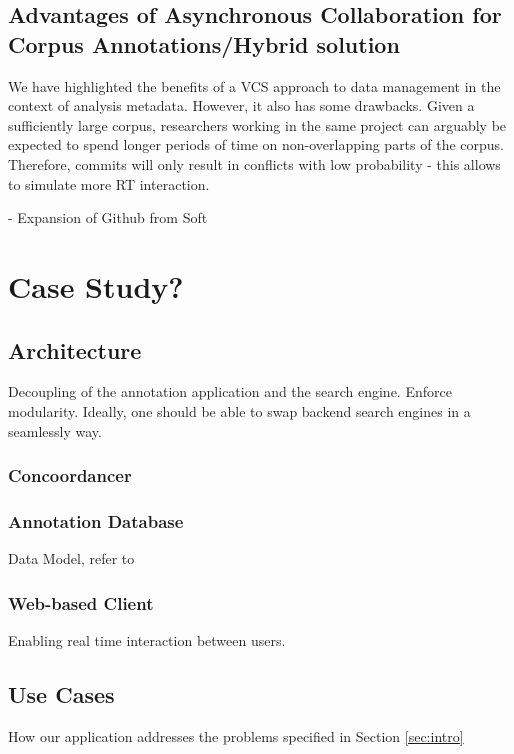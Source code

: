 \documentclass{sig-alternate}
\begin{document}

\subsection{Advantages of Asynchronous Collaboration for Corpus Annotations/Hybrid solution}
\label{subsec:hybrid}
We have highlighted the benefits of a VCS approach to data management in the context of
analysis metadata. However, it also has some drawbacks.
Given a sufficiently large corpus, researchers working in the same project can arguably be
expected to spend longer periods of time on non-overlapping parts of the corpus. Therefore,
commits will only result in conflicts with low probability - this allows to simulate more
RT interaction.

- Expansion of Github from Soft

\section{Case Study?}\label{sec:case}

\subsection{Architecture}
Decoupling of the annotation application and the search engine. Enforce modularity.
Ideally, one should be able to swap backend search engines in a seamlessly way.

\subsubsection{Concoordancer}

\subsubsection{Annotation Database}
Data Model, refer to 

\subsubsection{Web-based Client}
Enabling real time interaction between users.

\subsection{Use Cases}
How our application addresses the problems specified in Section \ref{sec:intro}
\end{document}
